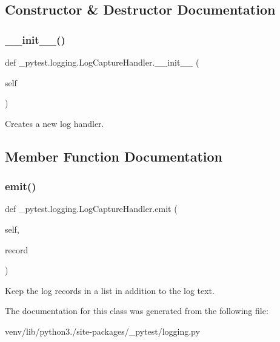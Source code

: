 \subsection{Constructor \& Destructor Documentation}
\mbox{\label{class__pytest_1_1logging_1_1_log_capture_handler_a1329c35c2ae164d5df28ee3a674e4e95}} 
\subsubsection{\texorpdfstring{\+\_\+\+\_\+init\+\_\+\+\_\+()}{\_\_init\_\_()}}
{\footnotesize\ttfamily def \+\_\+pytest.\+logging.\+Log\+Capture\+Handler.\+\_\+\+\_\+init\+\_\+\+\_\+ (\begin{DoxyParamCaption}\item[{}]{self }\end{DoxyParamCaption})}

\begin{DoxyVerb}Creates a new log handler.\end{DoxyVerb}
 

\subsection{Member Function Documentation}
\mbox{\label{class__pytest_1_1logging_1_1_log_capture_handler_a0997e513c8db86f1c105efdf822d217b}} 
\subsubsection{\texorpdfstring{emit()}{emit()}}
{\footnotesize\ttfamily def \+\_\+pytest.\+logging.\+Log\+Capture\+Handler.\+emit (\begin{DoxyParamCaption}\item[{}]{self,  }\item[{}]{record }\end{DoxyParamCaption})}

\begin{DoxyVerb}Keep the log records in a list in addition to the log text.\end{DoxyVerb}
 

The documentation for this class was generated from the following file\+:\begin{DoxyCompactItemize}
\item 
venv/lib/python3./site-\/packages/\+\_\+pytest/logging.\+py\end{DoxyCompactItemize}
